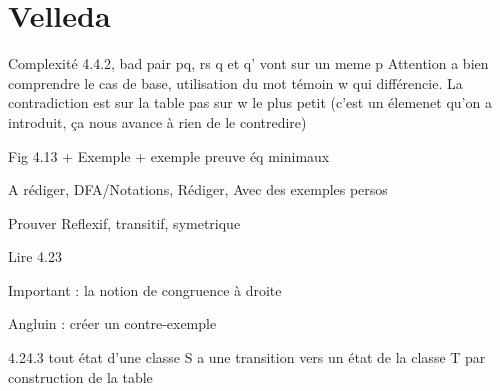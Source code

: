 \documentclass[french,letterpaper, 12pt]{article}
\begin{document}
	\section{Velleda}\label{sec:velleda}
	Complexité 4.4.2, bad pair pq, rs q et q' vont sur un meme p Attention a bien comprendre le cas de base, utilisation du mot témoin w qui différencie. La contradiction est sur la table pas sur w le plus petit (c'est un élemenet qu'on a introduit, ça nous avance à rien de le contredire)

	Fig 4.13 + Exemple + exemple preuve éq minimaux
	
	A rédiger, DFA/Notations, Rédiger, Avec des exemples persos
	
	Prouver Reflexif, transitif, symetrique
	
	Lire 4.23
	
	Important : la notion de congruence à droite
	
	Angluin : créer un contre-exemple
	
	4.24.3 tout état d'une classe S a une transition vers un état de la classe T par construction de la table
	
	
	\newpage
	
	
	
\end{document}
